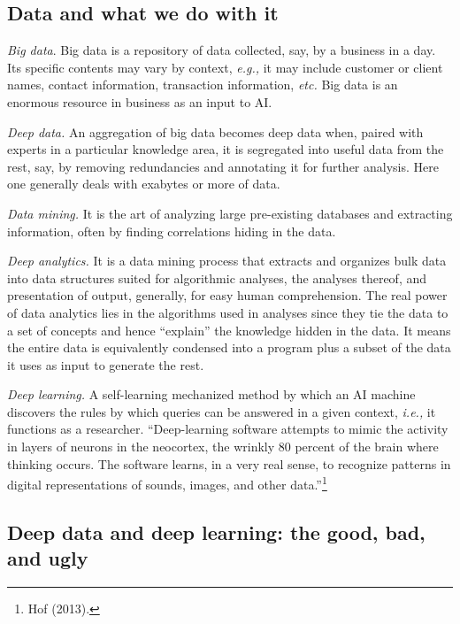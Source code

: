 \begin{multicols}{2}
\subsection*{Data and what we do with it}

\textit{Big data}. Big data is a repository of data collected, say, by a business in a day. Its specific contents may vary by context, \textit{e.g.,} it may include customer or client names, contact information, transaction information, \textit{etc.} Big data is an enormous resource in business as an input to AI.

\textit{Deep data.} An aggregation of big data becomes deep data when, paired with experts in a particular knowledge area, it is segregated into useful data from the rest, say, by removing redundancies and annotating it for further analysis. Here one generally deals with exabytes or more of data. 

\textit{Data mining.} It is the art of analyzing large pre-existing databases and extracting information, often by finding correlations hiding in the data.

\textit{Deep analytics.} It is a data mining process that extracts and organizes bulk data into data structures suited for algorithmic analyses, the analyses thereof, and presentation of output, generally, for easy human comprehension. The real power of data analytics lies in the algorithms used in analyses since they tie the data to a set of concepts and hence “explain” the knowledge hidden in the data. It means
the entire data is equivalently condensed into a program plus a subset of the data it uses as input to generate the rest.

\textit{Deep learning.} A self-learning mechanized method by which an AI machine discovers the rules by which queries can be answered in a given context, \textit{i.e.,} it functions as a researcher. “Deep-learning software attempts to mimic the activity in layers of neurons in the neocortex, the wrinkly 80 percent of the brain where thinking occurs. The software learns, in a very real sense, to recognize patterns in digital representations of sounds, images, and other data.”\footnote{Hof (2013).}
\bigskip

\subsection*{Deep data and deep learning: the good, bad, and ugly}


\end{multicols}
